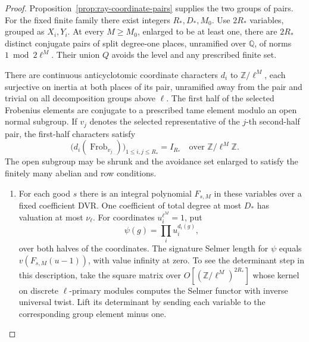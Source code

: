 \begin{proof}
Proposition~\ref{prop:ray-coordinate-pairs} supplies the two
groups of pairs. For the fixed finite family there exist integers \(R_*,D_*,M_0\).
Use \(2R_*\) variables, grouped as \(X_i,Y_i\). At every
\(M\ge M_0\), enlarged to be at least one, there are \(2R_*\)
distinct conjugate pairs of split degree-one places, unramified
over \(\mathbb Q\), of norms \(1\bmod 2\ell^M\). Their union
\(Q\) avoids the level and any prescribed finite set.

There are
continuous anticyclotomic coordinate characters \(d_i\) to
\(\mathbb Z/\ell^M\), each surjective on inertia at both places
of its pair, unramified away from the pair and trivial on all
decomposition groups above \(\ell\). The first half of the
selected Frobenius elements are conjugate to a prescribed tame element
modulo an open normal subgroup. If \(v_j\) denotes the selected representative of the
\(j\)-th second-half pair, the first-half characters satisfy
\[
 \bigl(d_i(\operatorname{Frob}_{v_j})\bigr)_{1\le i,j\le R_*}
       =I_{R_*}\quad\text{over }\mathbb Z/\ell^M\mathbb Z .
\] The
open subgroup may be shrunk and the avoidance set enlarged to
satisfy the finitely many abelian and row conditions.

\begin{enumerate}
\item For each good \(s\) there is an integral polynomial
\(F_{s,M}\) in these variables over a fixed coefficient DVR.
One coefficient of total degree at most \(D_*\) has valuation
at most \(\nu_\ell\). For coordinates \(u_i^{\ell^M}=1\), put
\[
 \psi(g)=\prod_i u_i^{d_i(g)},
\]
over both halves of the
coordinates. The signature Selmer length for \(\psi\) equals
\(v(F_{s,M}(u-1))\), with value infinity at zero. To see
the determinant step in this description, take the square
matrix over \(O[(\mathbb Z/\ell^M)^{2R_*}]\) whose kernel on
discrete \(\ell\)-primary modules computes the Selmer functor
with inverse universal twist. Lift its determinant by sending
each variable to the corresponding group element minus one.


\end{enumerate}
\end{proof}
